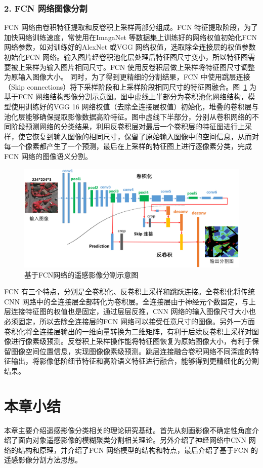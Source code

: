 \subsubsection*{2. FCN 网络图像分割}
\label{subsec:chap02-2-2-2}
FCN 网络由卷积特征提取和反卷积上采样两部分组成。FCN 特征提取阶段，为了加快网络训练速度，常使用在ImagaNet 等数据集上训练好的网络权值初始化FCN 网络参数，如对训练好的AlexNet\cite{krizhevsky2012imagenet} 或VGG\cite{simonyan2014very} 网络权值，选取除全连接层的权值参数初始化FCN 网络。输入图片经卷积池化层处理后特征图尺寸变小，所以特征图需要被上采样为输入图片相同尺寸。FCN 使用反卷积层做上采样将特征图尺寸调整为原输入图像大小。 同时，为了得到更精细的分割结果，FCN 中使用跳层连接（Skip connections）将下采样阶段和上采样阶段相同尺寸的特征图融合。图~\ref{fig:vgg-fcn} 为基于FCN 网络结构影像分割示意图。图中虚线上半部分为卷积池化网络结构，模型使用训练好的VGG 16 网络权值（去除全连接层权值）初始化，堆叠的卷积层与池化层能够确保提取影像数据高阶特征。图中虚线下半部分，分别从卷积网络的不同阶段预测网络的分类结果，利用反卷积层对最后一个卷积层的特征图进行上采样，使它恢复到输入图像的相同尺寸，保留了原始输入图像中的空间信息，从而对每一个像素都产生了一个预测，最后在上采样的特征图上进行逐像素分类，完成FCN 网络的图像语义分割。 

\begin{figure}[htb]
  \centering
  \includegraphics[width=1.0\textwidth]{figures/vgg-fcn}
  \caption{基于FCN网络的遥感影像分割示意图}\label{fig:vgg-fcn}
\end{figure}

FCN 有三个特点，分别是全卷积化、反卷积上采样和跳跃连接。全卷积化将传统CNN 网路中的全连接层全部转化为卷积层。全连接层由于神经元个数固定，与上层连接特征图的权值也是固定，通过层层反推，CNN 网络的输入图像尺寸大小也必须固定，所以去除全连接层的FCN 网络可以接受任意尺寸的图像。另外一方面卷积化将全连接层输出的一维向量转换为二维矩阵，有利于后续反卷积上采样对图像进行像素级预测。反卷积上采样操作能将特征图恢复为原始图像大小，有利于保留图像空间位置信息，实现图像像素级预测。跳层连接融合卷积网络不同深度的特征输出，将影像低阶细节特征和高阶语义特征进行融合，能够得到更精细化的分割结果。


\section{本章小结}
\label{sec:chap02-3}

本章主要介绍遥感影像分类相关的理论研究基础。首先从刻画影像不确定性角度介绍了面向对象遥感影像的模糊聚类分割相关理论。另外介绍了神经网络中CNN 网络的结构和原理，并介绍了FCN 网络模型的结构和特点，最后介绍了基于FCN 的遥感影像分割方法思想。